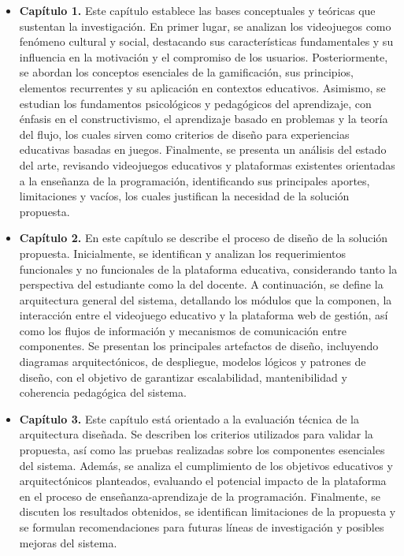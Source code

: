 \begin{itemize}
    \item \textbf{Capítulo 1. \chapterOne}  
    Este capítulo establece las bases conceptuales y teóricas que sustentan la investigación. En primer lugar, se analizan los videojuegos como fenómeno cultural y social, destacando sus características fundamentales y su influencia en la motivación y el compromiso de los usuarios. Posteriormente, se abordan los conceptos esenciales de la gamificación, sus principios, elementos recurrentes y su aplicación en contextos educativos. Asimismo, se estudian los fundamentos psicológicos y pedagógicos del aprendizaje, con énfasis en el constructivismo, el aprendizaje basado en problemas y la teoría del flujo, los cuales sirven como criterios de diseño para experiencias educativas basadas en juegos. Finalmente, se presenta un análisis del estado del arte, revisando videojuegos educativos y plataformas existentes orientadas a la enseñanza de la programación, identificando sus principales aportes, limitaciones y vacíos, los cuales justifican la necesidad de la solución propuesta.

    \item \textbf{Capítulo 2. \chapterSecond}  
    En este capítulo se describe el proceso de diseño de la solución propuesta. Inicialmente, se identifican y analizan los requerimientos funcionales y no funcionales de la plataforma educativa, considerando tanto la perspectiva del estudiante como la del docente. A continuación, se define la arquitectura general del sistema, detallando los módulos que la componen, la interacción entre el videojuego educativo y la plataforma web de gestión, así como los flujos de información y mecanismos de comunicación entre componentes. Se presentan los principales artefactos de diseño, incluyendo diagramas arquitectónicos, de despliegue, modelos lógicos y patrones de diseño, con el objetivo de garantizar escalabilidad, mantenibilidad y coherencia pedagógica del sistema.

    \item \textbf{Capítulo 3. \chapterThree}  
    Este capítulo está orientado a la evaluación técnica de la arquitectura diseñada. Se describen los criterios utilizados para validar la propuesta, así como las pruebas realizadas sobre los componentes esenciales del sistema. Además, se analiza el cumplimiento de los objetivos educativos y arquitectónicos planteados, evaluando el potencial impacto de la plataforma en el proceso de enseñanza-aprendizaje de la programación. Finalmente, se discuten los resultados obtenidos, se identifican limitaciones de la propuesta y se formulan recomendaciones para futuras líneas de investigación y posibles mejoras del sistema.
\end{itemize}



